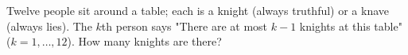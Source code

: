 Twelve people sit around a table; each is a knight (always truthful) or a knave (always lies). The $k$th person says "There are at most $k-1$ knights at this table" ($k=1,\dots,12$). How many knights are there?
